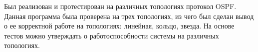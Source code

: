 Был реализован и протестирован на различных топологиях протокол OSPF. Данная программа была проверена на трех топологиях, из чего был сделан вывод о ее корректной работе на топологиях: линейная, кольцо, звезда. На основе тестов можно утверждать о работоспособности системы на различных топологиях.